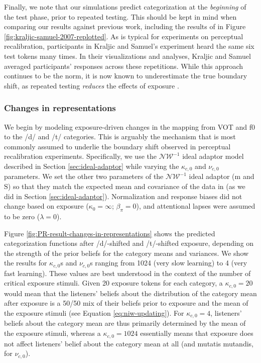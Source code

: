 \documentclass[
  11pt,
  man,floatsintext]{apa6}
\begin{document}
Finally, we note that our simulations predict categorization at the \emph{beginning} of the test phase, prior to repeated testing. This should be kept in mind when comparing our results against previous work, including the results of \textcite{kraljic-samuel2007} in Figure \ref{fig:kraljic-samuel-2007-replotted}. As is typical for experiments on perceptual recalibration, participants in Kraljic and Samuel's experiment heard the same six test tokens many times. In their visualizations and analyses, Kraljic and Samuel averaged participants' responses across these repetitions. While this approach continues to be the norm, it is now known to underestimate the true boundary shift, as repeated testing \emph{reduces} the effects of exposure \autocites{mitterer2011-perceptual-recalibration,liu-jaeger2018,liu-jaeger2019,scharenborg-janse2013,zheng-samuel2023}[for early discussion, see][p.~11]{norris2003}.

\hypertarget{changes-in-representations}{%
\subsubsection{Changes in representations}\label{changes-in-representations}}

We begin by modeling exposure-driven changes in the mapping from VOT and f0 to the /d/ and /t/ categories. This is arguably the mechanism that is most commonly assumed to underlie the boundary shift observed in perceptual recalibration experiments. Specifically, we use the \(\mathcal{NW}^{-1}\) ideal adaptor model described in Section \ref{sec:ideal-adaptor} while varying the \(\kappa_{c,0}\) and \(\nu_{c,0}\) parameters. We set the other two parameters of the \(\mathcal{NW}^{-1}\) ideal adaptor (\(\mathrm{m}\) and \(\mathrm{S}\)) so that they match the expected mean and covariance of the data in \textcite{chodroff-wilson2018} (as we did in Section \ref{sec:ideal-adaptor}). Normalization and response biases did not change based on exposure (\(\kappa_0 = \infty\); \(\beta_{\pi}=0\)), and attentional lapses were assumed to be zero (\(\lambda = 0\)).

Figure \ref{fig:PR-result-changes-in-representations} shows the predicted categorization functions after /d/-shifted and /t/-shifted exposure, depending on the strength of the prior beliefs for the category means and variances. We show the results for \(\kappa_{c,0}\)s and \(\nu_{c,0}\)s ranging from 1024 (very slow learning) to 4 (very fast learning). These values are best understood in the context of the number of critical exposure stimuli. Given 20 exposure tokens for each category, a \(\kappa_{c,0}=20\) would mean that the listeners' beliefs about the distribution of the category mean after exposure is a 50/50 mix of their beliefs prior to exposure and the mean of the exposure stimuli (see Equation \eqref{eq:niw-updating}). For \(\kappa_{c,0}=4\), listeners' beliefs about the category mean are thus primarily determined by the mean of the exposure stimuli, whereas a \(\kappa_{c,0}=1024\) essentially means that exposure does not affect listeners' belief about the category mean at all (and mutatis mutandis, for \(\nu_{c,0}\)).
\end{document}
